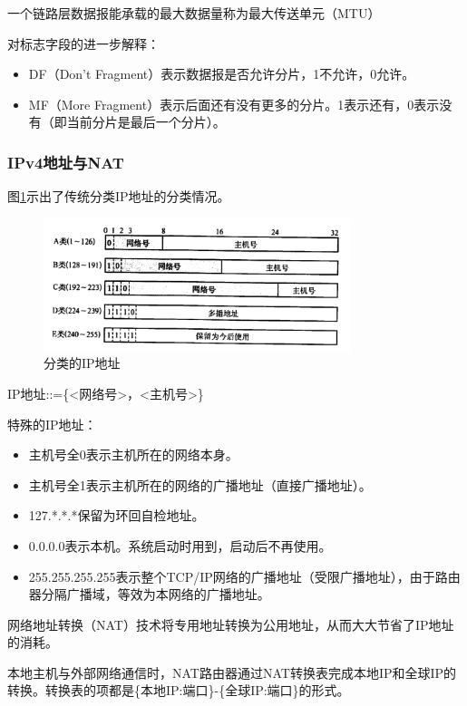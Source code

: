 \documentclass[12pt, a4paper, oneside]{ctexart}
\begin{document}
一个链路层数据报能承载的最大数据量称为最大传送单元（MTU）

对标志字段的进一步解释：
\begin{itemize}
    \item DF（Don't Fragment）表示数据报是否允许分片，1不允许，0允许。
    \item MF（More Fragment）表示后面还有没有更多的分片。1表示还有，0表示没有（即当前分片是最后一个分片）。
\end{itemize}

\subsubsection{IPv4地址与NAT}

图\ref{ip_classes}示出了传统分类IP地址的分类情况。

\begin{figure}[h]
    \centering
    \includegraphics[width=0.8\textwidth]{./images/ip_address.png}
    \caption{分类的IP地址}
    \label{ip_classes}
\end{figure}

IP地址::=\{<网络号>，<主机号>\}

特殊的IP地址：
\begin{itemize}
    \item 主机号全0表示主机所在的网络本身。
    \item 主机号全1表示主机所在的网络的广播地址（直接广播地址）。
    \item 127.*.*.*保留为环回自检地址。
    \item 0.0.0.0表示本机。系统启动时用到，启动后不再使用。
    \item 255.255.255.255表示整个TCP/IP网络的广播地址（受限广播地址），由于路由器分隔广播域，等效为本网络的广播地址。
\end{itemize}

网络地址转换（NAT）技术将专用地址转换为公用地址，从而大大节省了IP地址的消耗。

本地主机与外部网络通信时，NAT路由器通过NAT转换表完成本地IP和全球IP的转换。转换表的项都是\{本地IP:端口\}-\{全球IP:端口\}的形式。
\end{document}
